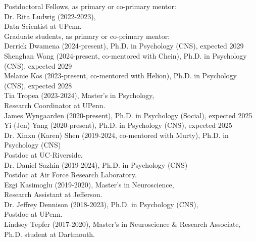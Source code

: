\documentclass[11pt, letterpaper]{article}
\begin{document}
\begin{tabbing}
Postdoctoral Fellows, as primary or co-primary mentor: \\  [.1cm]
\hspace{.5in} \= Dr. Rita \= Ludwig (2022-2023), \\ 
\> \> Data Scientist at UPenn. \\ [.2cm]

Graduate students, as primary or co-primary mentor: \\  [.1cm]
\> Derrick Dwamena (2024-present), Ph.D. in Psychology (CNS), expected 2029 \\ 
\> Shenghan Wang (2024-present, co-mentored with Chein), Ph.D. in Psychology (CNS), expected 2029 \\ 
\> Melanie Kos (2023-present, co-mentored with Helion), Ph.D. in Psychology (CNS), expected 2028 \\ 
\> Tia Tropea (2023-2024), Master's in Psychology, \\ 
\> \> Research Coordinator at UPenn. \\ 
\> James Wyngaarden (2020-present), Ph.D. in Psychology (Social), expected 2025 \\
\> Yi (Jen) Yang (2020-present), Ph.D. in Psychology (CNS), expected 2025 \\
\> Dr. Xinxu (Karen) Shen (2019-2024, co-mentored with Murty), Ph.D. in Psychology (CNS) \\
\> \> Postdoc at UC-Riverside. \\ 
\> Dr. Daniel Sazhin (2019-2024), Ph.D. in Psychology (CNS) \\
\> \> Postdoc at Air Force Research Laboratory. \\ 
\> Ezgi Kasimoglu (2019-2020), Master's in Neuroscience, \\ 
\> \> Research Assistant at Jefferson. \\
\> Dr. Jeffrey Dennison (2018-2023), Ph.D. in Psychology (CNS), \\
\> \> Postdoc at UPenn. \\ 
\> Lindsey Tepfer (2017-2020), Master's in Neuroscience \& Research Associate, \\
\> \> Ph.D. student at Dartmouth. \\ [.2cm]


\end{tabbing}
\end{document}
